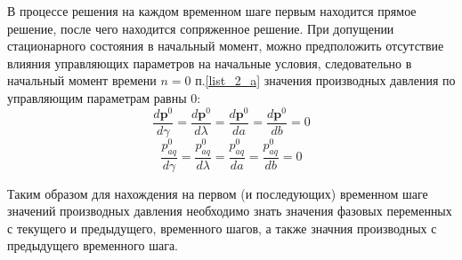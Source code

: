 \documentclass[14pt]{article}
\begin{document}
В процессе решения на каждом временном шаге первым находится прямое решение, после чего находится сопряженное решение. При допущении стационарного состояния в начальный момент, можно предположить отсутствие влияния управляющих параметров на начальные условия, следовательно в начальный момент времени $ n=0 $  п.\ref{list_2_a} значения производных давления по управляющим параметрам равны 0:
\begin{equation*}
\frac{d\boldsymbol{p}^0}{d\gamma} = \frac{d\boldsymbol{p}^0}{d\lambda} = \frac{d\boldsymbol{p}^0}{da} = \frac{d\boldsymbol{p}^0}{db} = 0
\end{equation*}
\begin{equation*}
\frac{p_{aq}^0}{d\gamma} = \frac{p_{aq}^0}{d\lambda} = \frac{p_{aq}^0}{da} = \frac{p_{aq}^0}{db} = 0
\end{equation*}

Таким образом для нахождения на первом (и последующих) временном шаге значений производных давления необходимо знать значения фазовых переменных с текущего и предыдущего, временного шагов, а также значния производных с предыдущего временного шага.
\end{document}

